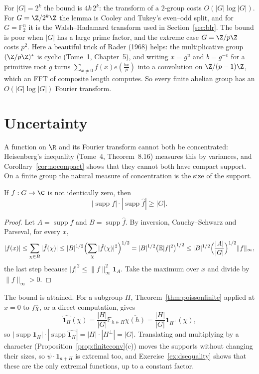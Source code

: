 For $|G|=2^k$ the bound is $4k\,2^k$: the transform of a $2$-group costs $O(|G|\log|G|)$. For $G=\Z/2^k\Z$ the lemma is Cooley and
Tukey's even--odd split, and for $G=\mathbb F_2^n$ it is the Walsh--Hadamard transform used in Section~\ref{sec:blr}. The bound is poor
when $|G|$ has a large prime factor, and the extreme case $G=\Z/p\Z$ costs $p^2$. Here a beautiful trick of Rader (1968) helps: the
multiplicative group $(\Z/p\Z)^*$ is cyclic (Tome~1, Chapter~5), and writing $x=g^u$ and $b=g^{-v}$ for a primitive root $g$ turns
$\sum_{x\ne0}f(x)e(\frac{bx}p)$ into a convolution on $\Z/(p-1)\Z$, which an FFT of composite length computes. So every finite abelian group
has an $O(|G|\log|G|)$ Fourier transform.

\section{Uncertainty}

A function on $\R$ and its Fourier transform cannot both be concentrated: Heisenberg's inequality (Tome~4, Theorem~8.16) measures this
by variances, and Corollary~\ref{cor:nocompact} shows that they cannot both have compact support. On a finite group the natural measure
of concentration is the size of the support.

\begin{theorem}\label{thm:donohostark}
If $f:G\to\C$ is not identically zero, then
\[|\operatorname{supp}f|\cdot|\operatorname{supp}\hat f|\ge|G|.\]
\end{theorem}
\begin{proof}
Let $A=\operatorname{supp}f$ and $B=\operatorname{supp}\hat f$. By inversion, Cauchy--Schwarz and Parseval, for every $x$,
\[|f(x)|\le\sum_{\chi\in B}|\hat f(\chi)|\le|B|^{1/2}\Bigl(\sum_\chi|\hat f(\chi)|^2\Bigr)^{1/2}=|B|^{1/2}\bigl(\mathbb E|f|^2\bigr)^{1/2}\le|B|^{1/2}\Bigl(\frac{|A|}{|G|}\Bigr)^{1/2}\|f\|_\infty,\]
the last step because $|f|^2\le\|f\|_\infty^2\mathbf 1_A$. Take the maximum over $x$ and divide by $\|f\|_\infty>0$.
\end{proof}

The bound is attained. For a subgroup $H$, Theorem~\ref{thm:poissonfinite} applied at $x=0$ to $f\overline\chi$, or a direct computation,
gives
\[\widehat{\mathbf 1_H}(\chi)=\frac{|H|}{|G|}\mathbb E_{h\in H}\overline{\chi(h)}=\frac{|H|}{|G|}\mathbf 1_{H^\perp}(\chi),\]
so $|\operatorname{supp}\mathbf 1_H|\cdot|\operatorname{supp}\widehat{\mathbf 1_H}|=|H|\cdot|H^\perp|=|G|$. Translating and multiplying by a character
(Proposition~\ref{prop:finiteconv}(c)) moves the supports without changing their sizes, so $\psi\cdot\mathbf 1_{a+H}$ is extremal too, and
Exercise~\ref{ex:dsequality} shows that these are the only extremal functions, up to a constant factor.

